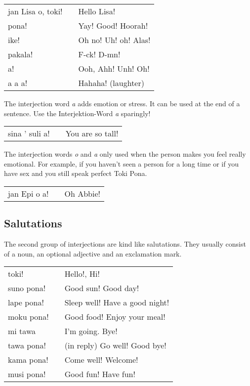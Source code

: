 \begin{supertabular}{p{5,5cm}|ll}
    jan Lisa o, toki! &  & Hello Lisa!          \\
    pona!             &  & Yay! Good! Hoorah!   \\
    ike!              &  & Oh no! Uh! oh! Alas! \\
    pakala!           &  & F-ck! D-mn!          \\
    a!                &  & Ooh, Ahh! Unh! Oh!   \\
    a a a!            &  & Hahaha! (laughter)   \\
\end{supertabular}

The interjection word \textit{a} adds emotion or stress.
It can be used at the end of a sentence.
Use the Interjektion-Word \textit{a} sparingly!

\begin{supertabular}{p{5,5cm}|ll}
    sina ' suli a! &  & You are so tall! \\
\end{supertabular}

The interjection words \textit{o} and \textit{a} only used when the person makes you feel really emotional.
For example, if you haven't seen a person for a long time or if you have sex and you still speak perfect Toki Pona.

\begin{supertabular}{p{5,5cm}|ll}
    jan Epi o a! &  & Oh Abbie! \\
\end{supertabular}

%
\subsection*{Salutations}
%
%
The second group of interjections are kind like salutations.
They usually consist of a noun, an optional adjective and an exclamation mark.

\begin{supertabular}{p{5,5cm}|ll}
    toki!      &  & Hello!, Hi!                    \\
    suno pona! &  & Good sun! Good day!            \\
    lape pona! &  & Sleep well! Have a good night! \\
    moku pona! &  & Good food! Enjoy your meal!    \\
    mi tawa    &  & I'm going. Bye!                \\
    tawa pona! &  & (in reply) Go well! Good bye!  \\
    kama pona! &  & Come well! Welcome!            \\
    musi pona! &  & Good fun! Have fun!            \\
\end{supertabular}

